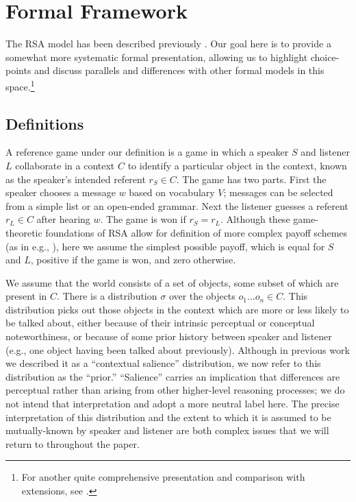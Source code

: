 \documentclass[man,noapacite]{apa2}
\begin{document}
\section{Formal Framework} \label{sec:models-intro}

The RSA model has been described previously \cite{frank2012,goodman2013,goodman2016}. Our goal here is to provide a somewhat more systematic formal presentation, allowing us to highlight choice-points and discuss parallels and differences with other formal models in this space.\footnote{For another quite comprehensive presentation and comparison with extensions, see .}



\subsection{Definitions}

A reference game under our definition is a game in which a speaker $S$ and listener $L$ collaborate in a context $C$ to identify a particular object in the context, known as the speaker's intended referent $r_S \in C$. The game has two parts. First the speaker chooses a message $w$ based on vocabulary $V$; messages can be selected from a simple list or an open-ended grammar. Next the listener guesses a referent $r_L \in C$ after hearing $w$. The game is won if $r_S=r_L$. Although these game-theoretic foundations of RSA allow for definition of more complex payoff schemes (as in e.g., ), here we assume the simplest possible payoff, which is equal for $S$ and $L$,  positive if the game is won, and zero otherwise.

We assume that the world consists of a set of objects, some subset of which are present in $C$. There is a distribution $\sigma$ over the objects ${o_1 ... o_n} \in C$. This distribution picks out those objects in the context which are more or less likely to be talked about, either because of their intrinsic perceptual or conceptual noteworthiness, or because of some prior history between speaker and listener (e.g., one object having been talked about previously). Although in previous work we described it as a ``contextual salience'' distribution, we now refer to this distribution as the ``prior.''  ``Salience'' carries an implication that differences are perceptual rather than arising from other higher-level reasoning processes; we do not intend that interpretation and adopt a more neutral label here. The precise interpretation of this distribution and the extent to which it is assumed to be mutually-known by speaker and listener are both complex issues that we will return to throughout the paper.
\end{document}
